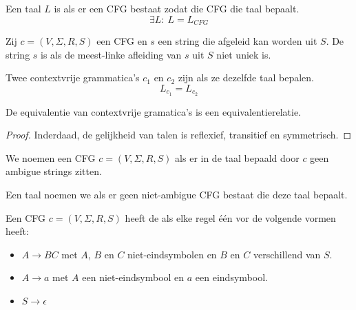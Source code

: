 \documentclass[main.tex]{subfiles}
\begin{document}
\begin{de}
  Een taal $L$ is  als er een CFG bestaat zodat die CFG die taal bepaalt.
  \[ \exists L:\ L = L_{CFG} \]
\end{de}

\begin{de}
  Zij $c = (V,\Sigma,R,S)$ een CFG en $s$ een string die afgeleid kan worden uit $S$.
  De string $s$ is  als de meest-linke afleiding van $s$ uit $S$ niet uniek is. 
\end{de}

\begin{de}
  Twee contextvrije grammatica's $c_{1}$ en $c_{2}$ zijn  als ze dezelfde taal bepalen.
  \[ L_{c_{1}} = L_{c_{2}} \]
\end{de}

\begin{st}
  De equivalentie van contextvrije gramatica's is een equivalentierelatie.

  \begin{proof}
    Inderdaad, de gelijkheid van talen is reflexief, transitief en symmetrisch.
  \end{proof}
\end{st}

\begin{de}
  We noemen een CFG $c = (V,\Sigma,R,S)$  als er in de taal bepaald door $c$ geen ambigue strings zitten.
\end{de}

\begin{de}
  Een taal noemen we  als er geen niet-ambigue CFG bestaat die deze taal bepaalt.
\end{de}

\begin{de}
  Een CFG $c = (V,\Sigma,R,S)$ heeft de  als elke regel \'e\'en vor de volgende vormen heeft:
  \begin{itemize}
  \item $A \rightarrow BC$ met $A$, $B$ en $C$ niet-eindsymbolen en $B$ en $C$ verschillend van $S$.
  \item $A \rightarrow a$ met $A$ een niet-eindsymbool en $a$ een eindsymbool.
  \item $S \rightarrow \epsilon$
  \end{itemize}
\end{de}
\end{document}
